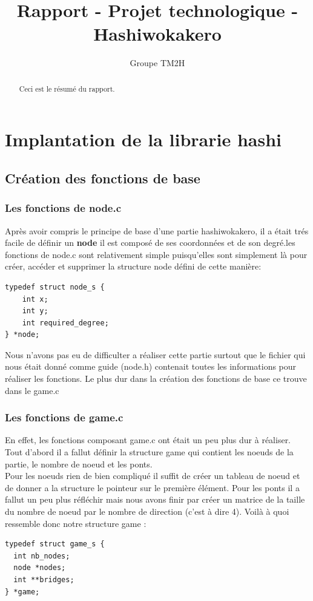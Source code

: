 \documentclass[12pt]{report}
\title{Rapport - Projet technologique - Hashiwokakero}
\author{Groupe TM2H}
\begin{document}
\maketitle

\begin{abstract}
Ceci est le résumé du rapport.
\end{abstract}

\tableofcontents

\chapter{Implantation de la librarie hashi}

\section{Création des fonctions de base}

\subsection{Les fonctions de node.c}
\textnormal{Après avoir compris le principe de base d'une partie hashiwokakero, il a était trés facile de définir un \textbf{node} il est composé de ses coordonnées et de son degré.les fonctions de node.c sont relativement simple puisqu'elles sont simplement là pour créer, accéder et supprimer la structure node défini de cette manière:}
\begin{verbatim}
typedef struct node_s {
	int x;
	int y;
	int required_degree;
} *node;
\end{verbatim}

\textnormal{Nous n'avons pas eu de difficulter a réaliser cette partie surtout que le fichier qui nous était donné comme guide (node.h) contenait toutes les informations pour réaliser les fonctions. Le plus dur dans la création des fonctions de base ce trouve dans le game.c}
\subsection{Les fonctions de game.c}
\textnormal{En effet, les fonctions composant game.c ont était un peu plus dur à réaliser. Tout d'abord il a fallut définir la structure game qui contient les noeuds de la partie, le nombre de noeud et les ponts.\\ Pour les noeuds rien de bien compliqué il suffit de créer un tableau de noeud et de donner a la structure le pointeur sur le première élément. Pour les ponts il a fallut un peu plus réfléchir mais nous avons finir par créer un matrice de la taille du nombre de noeud par le nombre de direction (c'est à dire 4). Voilà à quoi ressemble donc notre structure game :}
\begin{verbatim}
typedef struct game_s {
  int nb_nodes;
  node *nodes; 
  int **bridges;
} *game;
\end{verbatim}
\end{document}
